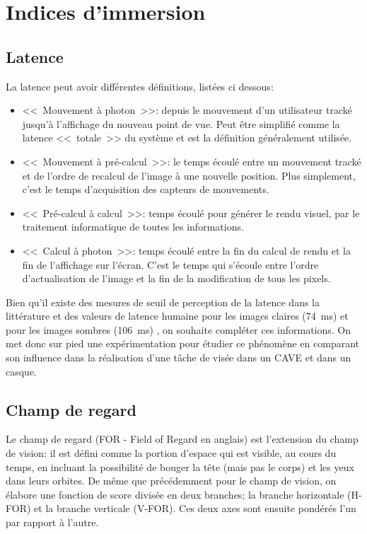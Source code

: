 \chapter{Indices d'immersion}
	\section{Latence}
	\par La latence peut avoir différentes définitions, listées ci dessous:
	\begin{itemize}
		\item <<~Mouvement à photon~>>: depuis le mouvement d'un utilisateur tracké jusqu'à l'affichage du nouveau point de vue. Peut être simplifié comme la latence <<~totale~>> du système et est la définition généralement utilisée.
		\item <<~Mouvement à pré-calcul~>>: le temps écoulé entre un mouvement tracké et de l'ordre de recalcul de l'image à une nouvelle position. Plus simplement, c'est le temps d'acquisition des capteurs de mouvements.
		\item <<~Pré-calcul à calcul~>>: temps écoulé pour générer le rendu visuel, par le traitement informatique de toutes les informations.
		\item <<~Calcul à photon~>>: temps écoulé entre la fin du calcul de rendu et la fin de l'affichage sur l'écran. C'est le temps qui s'écoule entre l'ordre d'actualisation de l'image et la fin de la modification de tous les pixels.
	\end{itemize}
	
	\par Bien qu'il existe des mesures de seuil de perception de la latence dans la littérature \citep{brooks_whats_1999,kemeny_driving_2014} et des valeurs de latence humaine pour les images claires (74~ms) et pour les images sombres (106~ms) \citep{feng_han_investigation_2010}, on souhaite compléter ces informations. On met donc sur pied une expérimentation pour étudier ce phénomène en comparant son influence dans la réalisation d'une tâche de visée dans un CAVE et dans un casque.
	
	\section{Champ de regard}
	\par Le champ de regard (FOR - Field of Regard en anglais) est l'extension du champ de vision: il est défini comme la portion d'espace qui est visible, au cours du temps, en incluant la possibilité de bouger la tête (mais pas le corps) et les yeux dans leurs orbites. De même que précédemment pour le champ de vision, on élabore une fonction de score divisée en deux branches; la branche horizontale (H-FOR) et la branche verticale (V-FOR). Ces deux axes sont ensuite pondérés l'un par rapport à l'autre.
	
